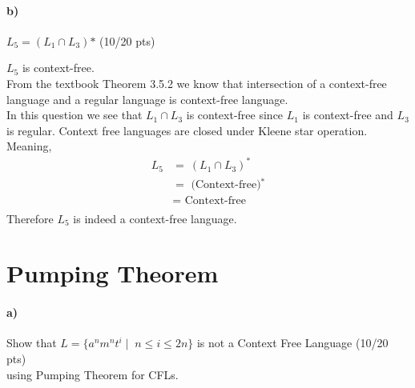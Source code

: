 \documentclass[a4paper,12pt]{article}
\begin{document}
\paragraph{b)} $L_5 = (L_1 \cap L_3)\text{*}$ \hfill \small{(10/20 pts)} \\

\begin{tcolorbox}
$L_5$ is context-free. \\
From the textbook Theorem 3.5.2 we know that intersection of a context-free language and a regular language is context-free language.\\
In this question we see that $L_1\cap L_3$ is context-free since $L_1$ is context-free and $L_3$ is regular. Context free languages are closed under Kleene star operation. Meaning, 
\begin{equation}
\begin{split}
L_5 &  = \ (L_1 \cap L_3)^* \\
       &  = \text{ (Context-free)$^*$} \\
       &  = \text{ Context-free } \\
\end{split}
\end{equation}
Therefore $L_5$ is indeed a context-free language.
\end{tcolorbox}





\newpage
\section{Pumping Theorem \hfill {}}

\paragraph{a)} Show that $L=\{a^n m^n t^i \mid \; n\leq i \leq 2n\}$ is not a Context Free Language \hfill \small{(10/20 pts)} \\
using Pumping Theorem for CFLs. \\
\end{document}
